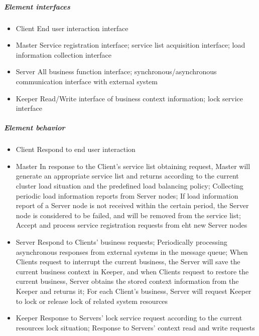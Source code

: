 \documentclass{article}
\begin{document}
			\subparagraph{Element interfaces}
			\begin{itemize}
			\item{Client} End user interaction interface
			\item{Master} Service registration interface; service list acquisition interface; load information collection interface
			\item{Server} All business function interface; synchronous/asynchronous communication interface with external system
			\item{Keeper} Read/Write interface of business context information; lock service interface
			\end{itemize}
			\subparagraph{Element behavior}
			\begin{itemize}
			\item{Client} Respond to end user interaction
			\item{Master} In response to the Client's service list obtaining request, Master will generate an appropriate service list and returns according to the current cluster load situation and the predefined load balancing policy; Collecting periodic load information reports from Server nodes; If load information report of a Server node is not received within the certain period, the Server node is considered to be failed, and will be removed from the service list; Accept and process service registration requests from eht new Server nodes			
			\item{Server} Respond to Clients' business requests; Periodically processing asynchronous responses from external systems  in the message queue; When Clients request to interrupt the current business, the Server will save the current business context in Keeper, and when Clients request to restore the current business, Server obtains the stored context information from the Keeper and returns it; For each Client's business, Server will request Keeper to lock or release lock of related system resources 			
			\item{Keeper} Response to Servers' lock service request according to the current resources lock situation; Response to Servers' context read and write requests			
			\end{itemize}
\end{document}
